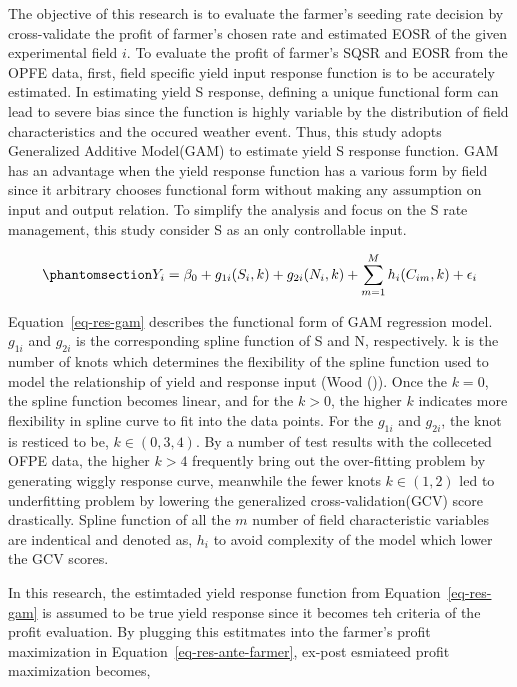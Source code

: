 \documentclass[
]{article}
\begin{document}
The objective of this research is to evaluate the farmer's seeding rate
decision by cross-validate the profit of farmer's chosen rate and
estimated EOSR of the given experimental field \(i\). To evaluate the
profit of farmer's SQSR and EOSR from the OPFE data, first, field
specific yield input response function is to be accurately estimated. In
estimating yield S response, defining a unique functional form can lead
to severe bias since the function is highly variable by the distribution
of field characteristics and the occured weather event. Thus, this study
adopts Generalized Additive Model(GAM) to estimate yield S response
function. GAM has an advantage when the yield response function has a
various form by field since it arbitrary chooses functional form without
making any assumption on input and output relation. To simplify the
analysis and focus on the S rate management, this study consider S as an
only controllable input.

\begin{equation}\phantomsection\label{eq-res-gam}{
Y_{i} = \beta_0 + g_{1i}(S_{i},k) + g_{2i}(N_{i},k) + \sum_{m=1}^{M} h_{i}(C_{im},k) + \epsilon_i
}\end{equation}

Equation~\ref{eq-res-gam} describes the functional form of GAM
regression model. \(g_{1i}\) and \(g_{2i}\) is the corresponding spline
function of S and N, respectively. k is the number of knots which
determines the flexibility of the spline function used to model the
relationship of yield and response input (Wood
()). Once the \(k=0\), the
spline function becomes linear, and for the \(k>0\), the higher \(k\)
indicates more flexibility in spline curve to fit into the data points.
For the \(g_{1i}\) and \(g_{2i}\), the knot is resticed to be,
\(k\in(0,3,4)\). By a number of test results with the colleceted OFPE
data, the higher \(k>4\) frequently bring out the over-fitting problem
by generating wiggly response curve, meanwhile the fewer knots
\(k\in(1,2)\) led to underfitting problem by lowering the generalized
cross-validation(GCV) score drastically. Spline function of all the
\(m\) number of field characteristic variables are indentical and
denoted as, \(h_i\) to avoid complexity of the model which lower the GCV
scores.

In this research, the estimtaded yield response function from
Equation~\ref{eq-res-gam} is assumed to be true yield response since it
becomes teh criteria of the profit evaluation. By plugging this
estitmates into the farmer's profit maximization in
Equation~\ref{eq-res-ante-farmer}, ex-post esmiateed profit maximization
becomes,
\end{document}
